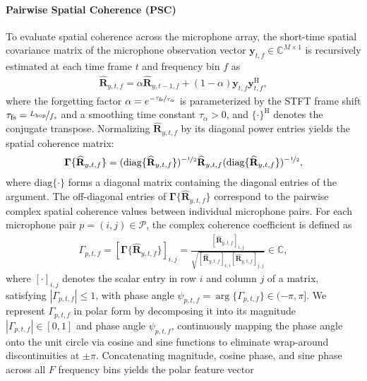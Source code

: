 \documentclass[lettersize,journal]{IEEEtran}
\begin{document}
\paragraph{Pairwise Spatial Coherence (PSC)}
To evaluate spatial coherence across the microphone array, the short-time spatial covariance matrix of the microphone observation vector $\mathbf{y}_{t,f} \in \mathbb{C}^{M \times 1}$ is recursively estimated at each time frame $t$ and frequency bin $f$ as
\begin{align}
  \widehat{\mathbf{R}}_{y,t,f} = \alpha \widehat{\mathbf{R}}_{y,t-1,f} + (1-\alpha) \mathbf{y}_{t,f} \mathbf{y}_{t,f}^{\mathrm{H}},
  \label{eq:cov_est_rec}
\end{align}
where the forgetting factor $\alpha = e^{-\nicefrac{\tau_{\mathrm{fs}}}{\tau_{\alpha}}}$ is parameterized by the \gls{STFT} frame shift $\tau_{\mathrm{fs}} = \nicefrac{L_{\mathrm{hop}}}{f_s}$ and a smoothing time constant $\tau_{\alpha} > 0$, and $\{\cdot\}^{\mathrm{H}}$ denotes the conjugate transpose. Normalizing $\widehat{\mathbf{R}}_{y,t,f}$ by its diagonal power entries yields the spatial coherence matrix:
\begin{align}
  \bm{\Gamma}\{\widehat{\mathbf{R}}_{y,t,f}\} = (\mathrm{diag}\{\widehat{\mathbf{R}}_{y,t,f}\})^{-\nicefrac{1}{2}} \widehat{\mathbf{R}}_{y,t,f} (\mathrm{diag}\{\widehat{\mathbf{R}}_{y,t,f}\})^{-\nicefrac{1}{2}},
  \label{eq:coherence_operator}
\end{align}
where $\mathrm{diag}\{\cdot\}$ forms a diagonal matrix containing the diagonal entries of the argument. The off-diagonal entries of $\bm{\Gamma}\{\widehat{\mathbf{R}}_{y,t,f}\}$ correspond to the pairwise complex spatial coherence values between individual microphone pairs. For each microphone pair $p = (i, j) \in \mathcal{P}$, the complex coherence coefficient is defined as
\begin{align}
  \Gamma_{p,t,f} = [\bm{\Gamma}\{\widehat{\mathbf{R}}_{y,t,f}\}]_{i,j} = \frac{[\widehat{\mathbf{R}}_{y,t,f}]_{i,j}}{\sqrt{[\widehat{\mathbf{R}}_{y,t,f}]_{i,i} [\widehat{\mathbf{R}}_{y,t,f}]_{j,j}}} \in \mathbb{C},
  \label{eq:feat_psc_scalar}
\end{align}
where $[\cdot]_{i,j}$ denotes the scalar entry in row $i$ and column $j$ of a matrix, satisfying $|\Gamma_{p,t,f}| \le 1$, with phase angle $\psi_{p,t,f} = \arg\{\Gamma_{p,t,f}\} \in (-\pi, \pi]$. We represent $\Gamma_{p,t,f}$ in polar form by decomposing it into its magnitude $|\Gamma_{p,t,f}| \in [0, 1]$ and phase angle $\psi_{p,t,f}$, continuously mapping the phase angle onto the unit circle via cosine and sine functions to eliminate wrap-around discontinuities at $\pm\pi$. Concatenating magnitude, cosine phase, and sine phase across all $F$ frequency bins yields the polar feature vector
\end{document}
